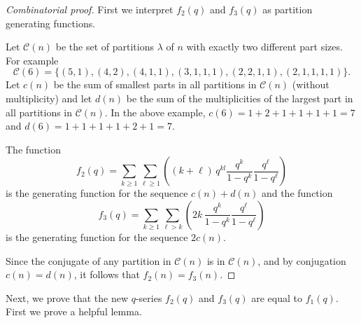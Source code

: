 \documentclass[a4paper,reqno,12pt]{amsart}
\begin{document}
\begin{proof}[Combinatorial proof] First we interpret $f_2(q)$ and $f_3(q)$ as partition generating functions. 




\noindent
Let $\mathcal C(n)$ be the set of partitions $\lambda$ of $n$ with exactly two different part sizes. For example $$\mathcal C(6)=\{(5,1), (4, 2), (4,1,1), (3, 1,1,1), (2, 2,1,1), (2, 1,1,1,1)\}.$$ 
Let $c(n)$ be the sum of smallest parts in all partitions in $\mathcal C(n)$ (without multiplicity) and let $d(n)$ be the sum of the multiplicities of the largest part in all partitions in $\mathcal C(n)$. In the above example, $c(6)=1+2+1+1+1+1= 7$ and $d(6)=1+1+1+1+2+1=7$. 

\smallskip
\noindent
The function $$f_2(q)=\sum_{k\geq1}\sum_{\ell\geq1}
\left((k+\ell)\, q^{kl}\frac{q^{k}}{1-q^k}\frac{q^{\ell}}{1-q^{\ell}}\right)$$ is the generating function for the sequence $c(n)+d(n)$  
and the function  $$f_3(q)=\sum_{k\geq1}\sum_{\ell>k}
\left(2k\, \frac{q^{k}}{1-q^k}\frac{q^{\ell}}{1-q^{\ell}}\right)$$ is the generating function for the sequence $2c(n)$.  

\smallskip

\noindent
Since the conjugate of any partition in $\mathcal C(n)$ is in $\mathcal C(n)$, and by conjugation $c(n)=d(n)$, it follows that $f_2(n)=f_3(n)$. 
\end{proof}

Next, we prove that the new $q$-series $f_2(q)$ and $f_3(q)$ are equal to $f_1(q)$. 
First we prove a helpful lemma. 
\end{document}
